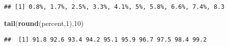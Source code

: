 \documentclass[]{book}
\newenvironment{Shaded}{\begin{snugshade}}{\end{snugshade}}
\newcommand{\DataTypeTok}[1]{\textcolor[rgb]{0.13,0.29,0.53}{#1}}
\newcommand{\DecValTok}[1]{\textcolor[rgb]{0.00,0.00,0.81}{#1}}
\newcommand{\KeywordTok}[1]{\textcolor[rgb]{0.13,0.29,0.53}{\textbf{#1}}}
\newcommand{\NormalTok}[1]{#1}
\newcommand{\OperatorTok}[1]{\textcolor[rgb]{0.81,0.36,0.00}{\textbf{#1}}}
\newcommand{\StringTok}[1]{\textcolor[rgb]{0.31,0.60,0.02}{#1}}
\begin{document}
\begin{Shaded}
\end{Shaded}

\begin{verbatim}
## [1] 0.8%, 1.7%, 2.5%, 3.3%, 4.1%, 5%, 5.8%, 6.6%, 7.4%, 8.3
\end{verbatim}

\begin{Shaded}
\begin{Highlighting}[]
\KeywordTok{tail}\NormalTok{(}\KeywordTok{round}\NormalTok{(percent,}\DecValTok{1}\NormalTok{),}\DecValTok{10}\NormalTok{)}
\end{Highlighting}
\end{Shaded}

\begin{verbatim}
##  [1] 91.8 92.6 93.4 94.2 95.1 95.9 96.7 97.5 98.4 99.2
\end{verbatim}
\end{document}
